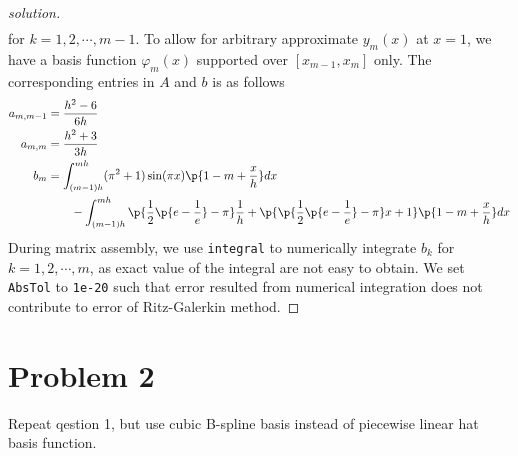 \documentclass[11pt]{article}
\begin{document}
\begin{proof}[solution]
\begin{align*}
    \end{align*}
    for $k=1,2,\cdots, m-1$. To allow for arbitrary approximate $y_m(x)$ at $x=1$, we have a basis function $\varphi_m(x)$ supported over $[x_{m-1}, x_m]$ only. The corresponding entries in $A$ and $b$ is as follows
    \begin{align*}
        a_{m, m-1} &= \frac{h^2-6}{6h} \\
        a_{m,m} &= \frac{h^2+3}{3h} \\
        b_m &=  
        \int_{(m-1)h}^{mh} (\pi^2 + 1) \sin(\pi x) \p{ 1-m+\frac{x}{h} } dx\\
        &\quad \quad 
        -\int_{(m-1)h}^{mh}\p{\frac{1}{2} \p{e - \frac{1}{e}} - \pi} \frac{1}{h} + \p{\p{\frac{1}{2} \p{e - \frac{1}{e}} - \pi}x + 1} \p{ 1-m+\frac{x}{h}} dx
    \end{align*}
    During matrix assembly, we use \texttt{integral} to numerically integrate $b_k$ for $k=1,2,\cdots,m$, as exact value of the integral are not easy to obtain. We set \texttt{AbsTol} to \texttt{1e-20} such that error resulted from numerical integration does not contribute to error of Ritz-Galerkin method.
\end{proof}


\newpage
\section*{Problem 2} Repeat qestion 1, but use cubic B-spline basis instead of piecewise linear hat basis function.
\end{document}
